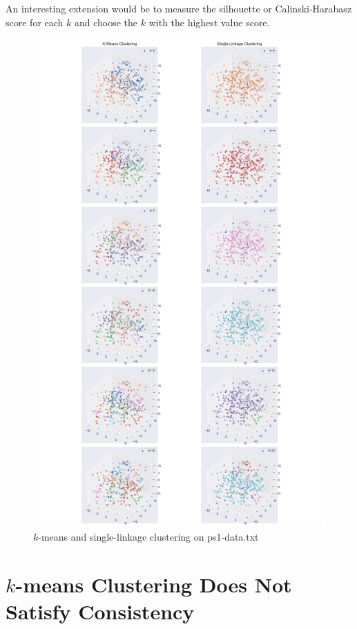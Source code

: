 \documentclass{article}
\begin{document}
        An interesting extension would be to measure the silhouette or Calinski-Harabasz score for each $k$ and choose the $k$ with the highest value score.

        \begin{figure}[]
            \label{fig:dataset2}
            \includegraphics[width=0.90\linewidth]{images/q4/clustering-dataset2.png}
            \caption{$k$-means and single-linkage clustering on ps1-data.txt}
        \end{figure}
        \newpage

\section[short]{$k$-means Clustering Does Not Satisfy Consistency}
\end{document}
